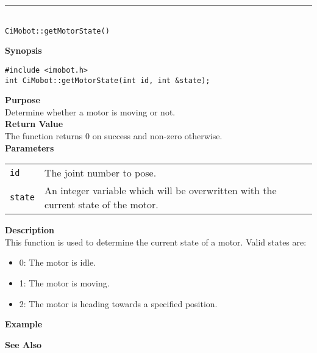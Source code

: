 \noindent
\vspace{5pt}
\rule{4.5in}{0.015in}\\
\noindent
{\LARGE \texttt{CiMobot::getMotorState()}}\\
{}

\noindent
{\bf Synopsis}\\
\begin{verbatim}
#include <imobot.h>
int CiMobot::getMotorState(int id, int &state);
\end{verbatim}

\noindent
{\bf Purpose}\\
Determine whether a motor is moving or not.\\

\noindent
{\bf Return Value}\\
The function returns 0 on success and non-zero otherwise.\\

\noindent
{\bf Parameters}
\vspace{-0.1in}
\begin{description}
\item               
\begin{tabular}{p{10 mm}p{145 mm}}
\texttt{id} & The joint number to pose. \\
\texttt{state} & An integer variable which will be overwritten with the current state of the motor. 
\end{tabular}
\end{description}

\noindent
{\bf Description}\\
This function is used to determine the current state of a motor. Valid states are:
\begin{itemize}
\item 0: The motor is idle.
\item 1: The motor is moving.
\item 2: The motor is heading towards a specified position.
\end{itemize}

\noindent
{\bf Example}\\
\noindent

\noindent
{\bf See Also}\\

